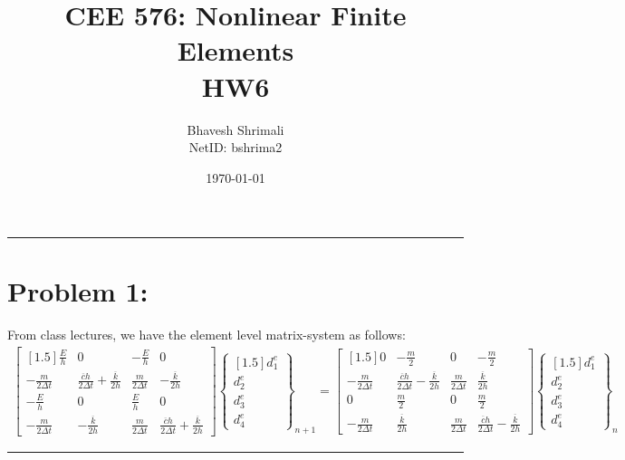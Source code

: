 
\usepackage{graphicx}
\title{\bf CEE 576: Nonlinear Finite Elements \\ HW6}
\author{Bhavesh Shrimali \\ NetID: bshrima2}
\date{\today}

\maketitle \hrule
\section*{Problem 1: }
From class lectures, we have the element level matrix-system as follows: 
\begin{align*}
\begin{bmatrix}[1.5]
\frac{E}{h} & 0 & -\frac{E}{h} & 0\\
-\frac{m}{2\Delta t} & \frac{\overline{c}h}{2\Delta t}+ \frac{\overline{k}}{2h} & \frac{m}{2\Delta t} & -\frac{\overline{k}}{2h} \\
-\frac{E}{h} & 0 & \frac{E}{h} & 0 \\
- \frac{m}{2\Delta t} & - \frac{\overline{k}}{2h} & \frac{m}{2\Delta t} & \frac{\overline{c}h}{2\Delta t}+ \frac{\overline{k}}{2h}
\end{bmatrix}
\begin{Bmatrix}[1.5]
d^e_1\\d^e_2\\d^e_3\\d^e_4
\end{Bmatrix}_{n+1}
= 
\begin{bmatrix}[1.5]
0 & -\frac{m}{2} & 0 & -\frac{m}{2}\\
-\frac{m}{2\Delta t} & \frac{\overline{c}h}{2\Delta t}-\frac{\overline{k}}{2h} & \frac{m}{2\Delta t} & \frac{\overline{k}}{2h} \\
0 & \frac{m}{2} & 0 & \frac{m}{2}\\
- \frac{m}{2\Delta t} & \frac{\overline{k}}{2h} &  \frac{m}{2\Delta t} & \frac{\overline{c}h}{2\Delta t}- \frac{\overline{k}}{2h}
\end{bmatrix} 
\begin{Bmatrix}[1.5]
d^e_1\\d^e_2\\d^e_3\\d^e_4
\end{Bmatrix}_{n}
\end{align*}\hrule
